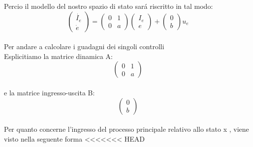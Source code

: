 \documentclass[a4paper,13pt]{article}
\begin{document}
Percio il modello del nostro spazio di stato sar\'a riscritto in tal modo:
\begin{equation*}	
\begin{pmatrix}
	
	\dot{I_{e}} \\ \dot{e}
	
\end{pmatrix} =         %
\begin{pmatrix}

	0&1\\0&a

\end{pmatrix}
\begin{pmatrix}

	I_{e}\\e

\end{pmatrix} +           %
\begin{pmatrix}

	0\\b

\end{pmatrix} u_e
\end{equation*} \\
Per andare a calcolare i guadagni dei singoli controlli\\

	Esplicitiamo la matrice dinamica A:        %
\begin{equation*}
\begin{pmatrix}

	0&1\\0&a

\end{pmatrix}
\end{equation*} \\

	e la matrice ingresso-uscita B:          %
\begin{equation*}
\begin{pmatrix}

	0\\b

\end{pmatrix}
\end{equation*} \\

Per quanto concerne l'ingresso del processo principale relativo allo stato x ,
viene visto nella seguente forma
<<<<<<< HEAD
\end{document}
